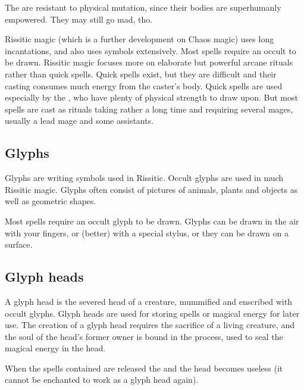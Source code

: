 The  are resistant to physical mutation, since their bodies are superhumanly empowered. They may still go mad, tho. 

Rissitic magic (which is a further development on Chaos magic) uses long incantations, and also uses symbols extensively. 
Most spells require an occult  to be drawn. 
Rissitic magic focuses more on elaborate but powerful arcane rituals rather than quick spells. 
Quick spells exist, but they are difficult and their casting consumes much energy from the caster's body. 
Quick spells are used especially by the , who have plenty of physical strength to draw upon. 
But most spells are cast as rituals taking rather a long time and requiring several mages, usually a lead mage and some assistants. 









\subsection{Glyphs}
Glyphs are writing symbols used in Rissitic. 
Occult glyphs are used in much Rissitic magic. 
Glyphs often consist of pictures of animals, plants and objects as well as geometric shapes.

Most spells require an occult {glyph} to be drawn. 
Glyphs can be drawn in the air with your fingers, or (better) with a special stylus, or they can be drawn on a surface. 









\subsection{Glyph heads}
A glyph head is the severed head of a creature, mummified and enscribed with occult glyphs. Glyph heads are used for storing spells or magical energy for later use. The creation of a glyph head requires the sacrifice of a living creature, and the soul of the head's former owner is bound in the process, used to seal the magical energy in the head. 

When the spells contained are released the  and the head becomes useless (it cannot be enchanted to work as a glyph head again). 









